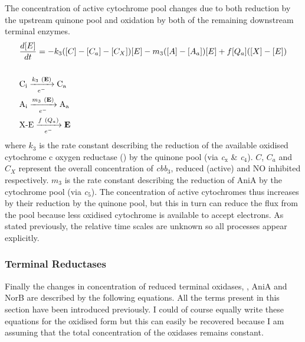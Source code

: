 The concentration of active cytochrome pool changes due to both reduction by the upstream quinone pool and oxidation by both of the remaining downstream terminal enzymes. 
\begin{eqnarray}
&\frac{d[E]}{dt} = -k_3([C] - [C_a] - [C_X])[E]  - m_3([A] - [A_a])[E] + f[Q_a]([X]-[E]) \nonumber \\\nonumber \\
&\textnormal{C$_\textnormal{i}$} \xrightarrow[e^-]{k_3~(\mathbf{E})} \textnormal{C$_\textnormal{a}$} \nonumber \\
&\textnormal{A$_\textnormal{i}$} \xrightarrow[e^-]{m_3~(\mathbf{E})} \textnormal{A$_\textnormal{a}$} \nonumber \\
&\textnormal{X-E} \xrightarrow[e^-]{f~(Q_a)} \mathbf{E}
\label{eq:cytochromes}
\end{eqnarray}
where $k_3$ is the rate constant describing the reduction of the available oxidised cytochrome c oxygen reductase (\cbbthree{}) by the quinone pool (via \textit{c$_{\textrm{x}}$} \& \textit{c$_{\textrm{4}}$}). $C$, $C_a$ and $C_X$ represent the overall concentration of \textit{cbb$_{\textrm{3}}$}, reduced (active) \cbbthree{} and NO inhibited \cbbthree{} respectively. $m_3$ is the rate constant describing the reduction of AniA by the cytochrome pool (via \textit{c$_{\textrm{5}}$}). The concentration of active cytochromes thus increases by their reduction by the quinone pool, but this in turn can reduce the flux from the pool because less oxidised cytochrome is available to accept electrons. As stated previously, the relative time scales are unknown so all processes appear explicitly.

\subsubsection{Terminal Reductases}
Finally the changes in concentration of reduced terminal oxidases, \cbbthree{}, AniA and NorB are described by the following equations. All the terms present in this section have been introduced previously. I could of course equally write these equations for the oxidised form but this can easily be recovered because I am assuming that the total concentration of the oxidases remains constant.

